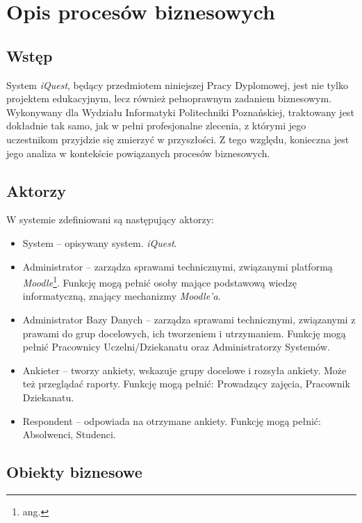\chapter{Opis procesów biznesowych}
\label{Chapter2}

\section{Wstęp}
\label{Chapter21}

System \textit{iQuest}, będący przedmiotem niniejszej Pracy Dyplomowej, jest nie tylko projektem edukacyjnym, lecz również pełnoprawnym zadaniem biznesowym. Wykonywany dla Wydziału Informatyki Politechniki Poznańskiej, traktowany jest dokładnie tak samo, jak w pełni profesjonalne zlecenia, z którymi jego uczestnikom przyjdzie się zmierzyć w przyszłości. Z tego względu, konieczna jest jego analiza w kontekście powiązanych procesów biznesowych.

\section{Aktorzy}
\label{Chapter22}

W systemie zdefiniowani są następujący aktorzy:
\begin{itemize}
\item System -- opisywany system. \textit{iQuest}.
\item Administrator -- zarządza sprawami technicznymi, związanymi platformą \textit{Moodle}\footnote{ang. }. Funkcję mogą pełnić osoby mające podstawową wiedzę informatyczną, znający mechanizmy \textit{Moodle'a}.
\item Administrator Bazy Danych -- zarządza sprawami technicznymi, związanymi z prawami do grup docelowych, ich tworzeniem i utrzymaniem. Funkcję mogą pełnić Pracownicy Uczelni\slash Dziekanatu oraz Administratorzy Systemów.
\item Ankieter -- tworzy ankiety, wskazuje grupy docelowe i rozsyła ankiety. Może też przeglądać raporty. Funkcję mogą pełnić: Prowadzący zajęcia, Pracownik Dziekanatu.
\item Respondent -- odpowiada na otrzymane ankiety. Funkcję mogą pełnić: Absolwenci, Studenci.
\end{itemize}

\section{Obiekty biznesowe}
\label{Chapter23}

